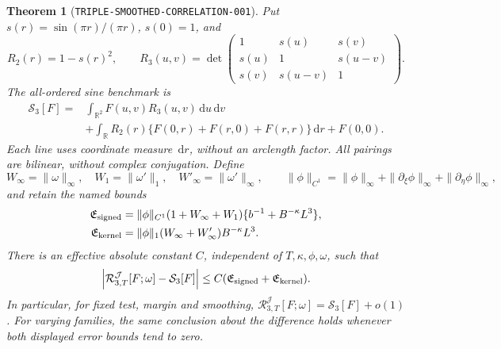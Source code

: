 \documentclass[11pt]{article}
\newtheorem{theorem}[lemma]{Theorem}
\newcommand{\dd}{\,\mathrm d}
\begin{document}
\begin{theorem}[\texttt{TRIPLE-SMOOTHED-CORRELATION-001}]
Put \(s(r)=\sin(\pi r)/(\pi r)\), \(s(0)=1\), and
\[
 R_2(r)=1-s(r)^2,\qquad
 R_3(u,v)=\det\begin{pmatrix}
 1&s(u)&s(v)\\s(u)&1&s(u-v)\\s(v)&s(u-v)&1
 \end{pmatrix}.
\]
The all-ordered sine benchmark is
\begin{equation}\label{eq:triple-assembled-main}
 \begin{split}
 \mathcal S_3[F]={}&\int_{\mathbb R^2}F(u,v)R_3(u,v)\dd u\dd v\\
 &+\int_{\mathbb R}R_2(r)\{F(0,r)+F(r,0)+F(r,r)\}\dd r+F(0,0).
 \end{split}
\end{equation}
Each line uses coordinate measure \(\dd r\), without an arclength
factor. All pairings are bilinear, without complex conjugation.
Define
\[
 W_\infty=\|\omega\|_\infty,\quad W_1=\|\omega'\|_1,\quad
 W'_\infty=\|\omega'\|_\infty,\qquad
 \|\phi\|_{C^1}=\|\phi\|_\infty+
 \|\partial_\xi\phi\|_\infty+\|\partial_\eta\phi\|_\infty,
\]
and retain the named bounds
\begin{align}
 \mathfrak E_{\rm signed}
 &=\|\phi\|_{C^1}(1+W_\infty+W_1)
              \{b^{-1}+B^{-\kappa}L^3\},\notag\\
 \mathfrak E_{\rm kernel}
 &=\|\phi\|_1(W_\infty+W'_\infty)B^{-\kappa}L^3.
 \label{eq:triple-assembled-errors}
\end{align}
There is an effective absolute constant \(C\), independent of
\(T,\kappa,\phi,\omega\), such that
\begin{equation}\label{eq:triple-assembled-theorem}
 \left|\mathcal R^{\mathcal J}_{3,T}[F;\omega]-\mathcal S_3[F]\right|
 \leq C(\mathfrak E_{\rm signed}+\mathfrak E_{\rm kernel}).
\end{equation}
In particular, for fixed test, margin and smoothing,
\(\mathcal R^{\mathcal J}_{3,T}[F;\omega]=\mathcal S_3[F]+o(1)\).
For varying families, the same conclusion about the difference holds
whenever both displayed error bounds tend to zero.
\end{theorem}
\end{document}
